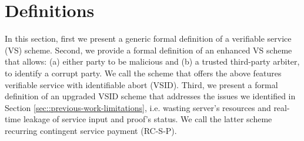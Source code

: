 
\section{Definitions}\label{Definition}

In this section, first we present a generic formal definition of a verifiable service (VS) scheme. Second, we provide a formal definition of an enhanced VS scheme that  allows: (a) either party to be malicious and (b) a trusted third-party arbiter, to identify a corrupt party. We call the  scheme that offers the above features verifiable service with identifiable abort (VSID).   Third, we present a formal definition of an upgraded VSID scheme that  addresses   the issues we identified in Section \ref{sec::previous-work-limitations}, i.e. wasting server's resources and real-time leakage of service input and proof's status.  We call the latter scheme recurring contingent service payment (RC-S-P). 















